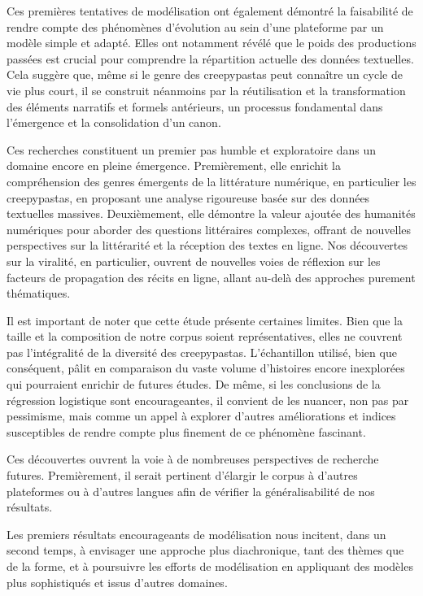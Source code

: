 \documentclass[12pt,a4paper,oneside,titlepage]{book} %
\begin{document}
Ces premières tentatives de modélisation ont également démontré la faisabilité de rendre compte des phénomènes d'évolution au sein d'une plateforme par un modèle simple et adapté. Elles ont notamment révélé que le poids des productions passées est crucial pour comprendre la répartition actuelle des données textuelles. Cela suggère que, même si le genre des creepypastas peut connaître un cycle de vie plus court, il se construit néanmoins par la réutilisation et la transformation des éléments narratifs et formels antérieurs, un processus fondamental dans l'émergence et la consolidation d'un canon.

Ces recherches constituent un premier pas humble et exploratoire dans un domaine encore en pleine émergence. Premièrement, elle enrichit la compréhension des genres émergents de la littérature numérique, en particulier les creepypastas, en proposant une analyse rigoureuse basée sur des données textuelles massives. Deuxièmement, elle démontre la valeur ajoutée des humanités numériques pour aborder des questions littéraires complexes, offrant de nouvelles perspectives sur la littérarité et la réception des textes en ligne. Nos découvertes sur la viralité, en particulier, ouvrent de nouvelles voies de réflexion sur les facteurs de propagation des récits en ligne, allant au-delà des approches purement thématiques.

Il est important de noter que cette étude présente certaines limites. Bien que la taille et la composition de notre corpus soient représentatives, elles ne couvrent pas l'intégralité de la diversité des creepypastas. L'échantillon utilisé, bien que conséquent, pâlit en comparaison du vaste volume d'histoires encore inexplorées qui pourraient enrichir de futures études. De même, si les conclusions de la régression logistique sont encourageantes, il convient de les nuancer, non pas par pessimisme, mais comme un appel à explorer d'autres améliorations et indices susceptibles de rendre compte plus finement de ce phénomène fascinant.

Ces découvertes ouvrent la voie à de nombreuses perspectives de recherche futures. Premièrement, il serait pertinent d'élargir le corpus à d'autres plateformes ou à d'autres langues afin de vérifier la généralisabilité de nos résultats.

Les premiers résultats encourageants de modélisation nous incitent, dans un second temps, à envisager une approche plus diachronique, tant des thèmes que de la forme, et à poursuivre les efforts de modélisation en appliquant des modèles plus sophistiqués et issus d'autres domaines.
\end{document}
